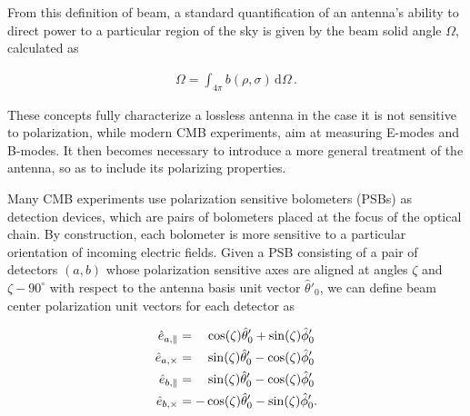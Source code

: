\documentclass[a4paper,11pt]{article}
\newcommand{\co}{\mathbin{\|}}
\newcommand{\cx}{\mathbin{\times}}
\begin{document}
\noindent
From this definition of beam, a standard quantification of an antenna's ability to direct power to a particular region of the sky is given by the beam solid angle $\Omega$, calculated as

\begin{equation}
\begin{aligned}
\Omega = \int_{4\pi} b(\rho,\sigma) \, \mathrm{d} \Omega \, .
\end{aligned}
\label{eq::omega_def}
\end{equation}

\noindent
These concepts fully characterize a lossless antenna in the case it is not sensitive to polarization, while modern CMB experiments, aim at measuring E-modes and B-modes. It then becomes necessary to introduce a more general treatment of the antenna, so as to include its polarizing properties. 


Many CMB experiments use polarization sensitive bolometers (PSBs) as detection devices, which are pairs of bolometers placed at the focus of the optical chain. By construction, each bolometer is more sensitive to a particular orientation of incoming electric fields. Given a PSB consisting of a pair of detectors $(a,b)$ whose polarization sensitive axes are aligned at angles $\zeta$ and $\zeta - 90^{\circ}$ with respect to the antenna basis unit vector $\hat{\theta}'_0$, we can define beam center polarization unit vectors for each detector as

\begin{align}
\hat{e}_{a,{\co}}    &= \quad \cos(\zeta)\hat{\theta}'_0 + \sin(\zeta)\hat{\phi}'_0 \\
\hat{e}_{a,{\cx}}    &= \quad \sin(\zeta)\hat{\theta}'_0 - \cos(\zeta)\hat{\phi}'_0 \\
\hat{e}_{b,{\co}}    &= \quad \sin(\zeta)\hat{\theta}'_0 - \cos(\zeta)\hat{\phi}'_0 \\
\hat{e}_{b,{\cx}}    &= -\cos(\zeta)\hat{\theta}'_0 - \sin(\zeta)\hat{\phi}'_0 \rm{.} 
\label{eq::copol_bolo}
\end{align}


\end{document}

